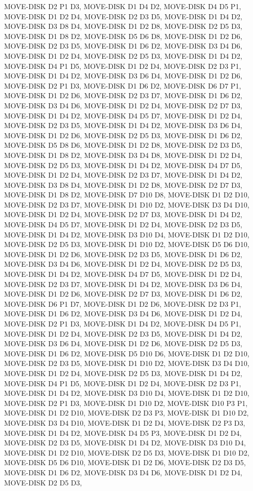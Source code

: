\documentclass[12pt]{article}
\begin{document}
\begin{appendix}
\begin{itemize}
MOVE-DISK D2 P1 D3,  MOVE-DISK D1 D4 D2,  MOVE-DISK D4 D5 P1,  MOVE-DISK D1 D2 D4,  MOVE-DISK D2 D3 D5,  MOVE-DISK D1 D4 D2,  MOVE-DISK D3 D8 D4,  MOVE-DISK D1 D2 D8,  MOVE-DISK D2 D5 D3,  MOVE-DISK D1 D8 D2,  MOVE-DISK D5 D6 D8,  MOVE-DISK D1 D2 D6,  MOVE-DISK D2 D3 D5,  MOVE-DISK D1 D6 D2,  MOVE-DISK D3 D4 D6,  MOVE-DISK D1 D2 D4,  MOVE-DISK D2 D5 D3,  MOVE-DISK D1 D4 D2,  MOVE-DISK D4 P1 D5,  MOVE-DISK D1 D2 D4,  MOVE-DISK D2 D3 P1,  MOVE-DISK D1 D4 D2,  MOVE-DISK D3 D6 D4,  MOVE-DISK D1 D2 D6,  MOVE-DISK D2 P1 D3,  MOVE-DISK D1 D6 D2,  MOVE-DISK D6 D7 P1,  MOVE-DISK D1 D2 D6,  MOVE-DISK D2 D3 D7,  MOVE-DISK D1 D6 D2,  MOVE-DISK D3 D4 D6,  MOVE-DISK D1 D2 D4,  MOVE-DISK D2 D7 D3,  MOVE-DISK D1 D4 D2,  MOVE-DISK D4 D5 D7,  MOVE-DISK D1 D2 D4,  MOVE-DISK D2 D3 D5,  MOVE-DISK D1 D4 D2,  MOVE-DISK D3 D6 D4,  MOVE-DISK D1 D2 D6,  MOVE-DISK D2 D5 D3,  MOVE-DISK D1 D6 D2,  MOVE-DISK D5 D8 D6,  MOVE-DISK D1 D2 D8,  MOVE-DISK D2 D3 D5,  MOVE-DISK D1 D8 D2,  MOVE-DISK D3 D4 D8,  MOVE-DISK D1 D2 D4,  MOVE-DISK D2 D5 
D3,  MOVE-DISK D1 D4 D2,  MOVE-DISK D4 D7 D5,  MOVE-DISK D1 D2 D4,  MOVE-DISK D2 D3 D7,  MOVE-DISK D1 D4 D2,  MOVE-DISK D3 D8 D4,  MOVE-DISK D1 D2 D8,  MOVE-DISK D2 D7 D3,  MOVE-DISK D1 D8 D2,  MOVE-DISK D7 D10 D8,  MOVE-DISK D1 D2 D10,  MOVE-DISK D2 D3 D7,  MOVE-DISK D1 D10 D2,  MOVE-DISK D3 D4 D10,  MOVE-DISK D1 D2 D4,  MOVE-DISK D2 D7 D3,  MOVE-DISK D1 D4 D2,  MOVE-DISK D4 D5 D7,  MOVE-DISK D1 D2 D4,  MOVE-DISK D2 D3 D5,  MOVE-DISK D1 D4 D2,  MOVE-DISK D3 D10 D4,  MOVE-DISK D1 D2 D10,  MOVE-DISK D2 D5 D3,  MOVE-DISK D1 D10 D2,  MOVE-DISK D5 D6 D10,  MOVE-DISK D1 D2 D6,  MOVE-DISK D2 D3 D5,  MOVE-DISK D1 D6 D2,  MOVE-DISK D3 D4 D6,  MOVE-DISK D1 D2 D4,  MOVE-DISK D2 D5 D3,  MOVE-DISK D1 D4 D2,  MOVE-DISK D4 D7 D5,  MOVE-DISK D1 D2 D4,  MOVE-DISK D2 D3 D7,  MOVE-DISK D1 D4 D2,  MOVE-DISK D3 D6 D4,  MOVE-DISK D1 D2 D6,  MOVE-DISK D2 D7 D3,  MOVE-DISK D1 D6 D2,  MOVE-DISK D6 P1 D7,  MOVE-DISK D1 D2 D6,  MOVE-DISK D2 D3 P1,  MOVE-DISK D1 D6 D2,  MOVE-DISK D3 D4 D6,  MOVE-DISK D1 D2 D4,  MOVE-DISK D2 P1 D3,  
MOVE-DISK D1 D4 D2,  MOVE-DISK D4 D5 P1,  MOVE-DISK D1 D2 D4,  MOVE-DISK D2 D3 D5,  MOVE-DISK D1 D4 D2,  MOVE-DISK D3 D6 D4,  MOVE-DISK D1 D2 D6,  MOVE-DISK D2 D5 D3,  MOVE-DISK D1 D6 D2,  MOVE-DISK D5 D10 D6,  MOVE-DISK D1 D2 D10,  MOVE-DISK D2 D3 D5,  MOVE-DISK D1 D10 D2,  MOVE-DISK D3 D4 D10,  MOVE-DISK D1 D2 D4,  MOVE-DISK D2 D5 D3,  MOVE-DISK D1 D4 D2,  MOVE-DISK D4 P1 D5,  MOVE-DISK D1 D2 D4,  MOVE-DISK D2 D3 P1,  MOVE-DISK D1 D4 D2,  MOVE-DISK D3 D10 D4,  MOVE-DISK D1 D2 D10,  MOVE-DISK D2 P1 D3,  MOVE-DISK D1 D10 D2,  MOVE-DISK D10 P3 P1,  MOVE-DISK D1 D2 D10,  MOVE-DISK D2 D3 P3,  MOVE-DISK D1 D10 D2,  MOVE-DISK D3 D4 D10,  MOVE-DISK D1 D2 D4,  MOVE-DISK D2 P3 D3,  MOVE-DISK D1 D4 D2,  MOVE-DISK D4 D5 P3,  MOVE-DISK D1 D2 D4,  MOVE-DISK D2 D3 D5,  MOVE-DISK D1 D4 D2,  MOVE-DISK D3 D10 D4,  MOVE-DISK D1 D2 D10,  MOVE-DISK D2 D5 D3,  MOVE-DISK D1 D10 D2,  MOVE-DISK D5 D6 D10,  MOVE-DISK D1 D2 D6,  MOVE-DISK D2 D3 D5,  MOVE-DISK D1 D6 D2,  MOVE-DISK D3 D4 D6,  MOVE-DISK D1 D2 D4,  MOVE-DISK D2 D5 D3,  

\end{itemize}
\end{appendix}
\end{document}
